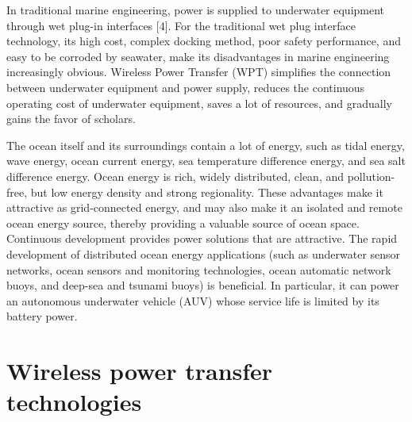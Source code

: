 In traditional marine engineering, power is supplied to underwater equipment through wet plug-in interfaces [4]. For the traditional wet plug interface technology, its high cost, complex docking method, poor safety performance, and easy to be corroded by seawater, make its disadvantages in marine engineering increasingly obvious. Wireless Power Transfer (WPT) simplifies the connection between underwater equipment and power supply, reduces the continuous operating cost of underwater equipment, saves a lot of resources, and gradually gains the favor of scholars.

The ocean itself and its surroundings contain a lot of energy, such as tidal energy, wave energy, ocean current energy, sea temperature difference energy, and sea salt difference energy. Ocean energy is rich, widely distributed, clean, and pollution-free, but low energy density and strong regionality. These advantages make it attractive as grid-connected energy, and may also make it an isolated and remote ocean energy source, thereby providing a valuable source of ocean space. Continuous development provides power solutions that are attractive. The rapid development of distributed ocean energy applications (such as underwater sensor networks, ocean sensors and monitoring technologies, ocean automatic network buoys, and deep-sea and tsunami buoys) is beneficial. In particular, it can power an autonomous underwater vehicle (AUV) whose service life is limited by its battery power.





\section{Wireless power transfer technologies}

